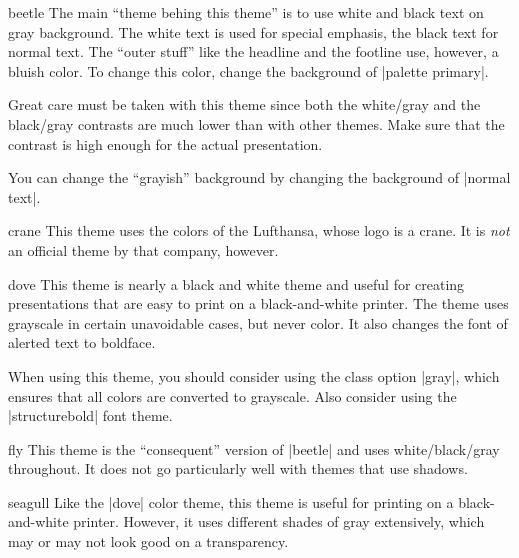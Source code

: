 \begin{colorthemeexample}{beetle}
  The main ``theme behing this theme'' is to use white and black text
  on gray background. The white text is used for special emphasis, the
  black text for normal text. The ``outer stuff'' like the headline
  and the footline use, however, a bluish color. To change this color,
  change the background of |palette primary|.
  
  Great care must be taken with this theme since both the white/gray
  and the black/gray contrasts are much lower than with other
  themes. Make sure that the contrast is high enough for the actual
  presentation.

  You can change the ``grayish'' background by changing the background
  of |normal text|.
\end{colorthemeexample}

\begin{colorthemeexample}{crane}
  This theme uses the colors of the Lufthansa, whose logo is a
  crane. It is \emph{not} an official theme by that company, however. 
\end{colorthemeexample}

\begin{colorthemeexample}{dove}
  This theme is nearly a black and white theme and useful for creating
  presentations that are easy to print on a black-and-white
  printer. The theme uses grayscale in certain unavoidable cases, but
  never color. It also changes the font of alerted text to boldface.

  When using this theme, you should consider using the class option
  |gray|, which ensures that all colors are converted to
  grayscale. Also consider using the |structurebold| font theme.
\end{colorthemeexample}


\begin{colorthemeexample}{fly}
  This theme is the ``consequent'' version  of |beetle| and uses
  white/black/gray throughout. It does not go particularly well with
  themes that use shadows.
\end{colorthemeexample}

\begin{colorthemeexample}{seagull}
  Like the |dove| color theme, this theme is useful for printing on a
  black-and-white printer. However, it uses different shades of gray
  extensively, which may or may not look good on a transparency.
\end{colorthemeexample}


